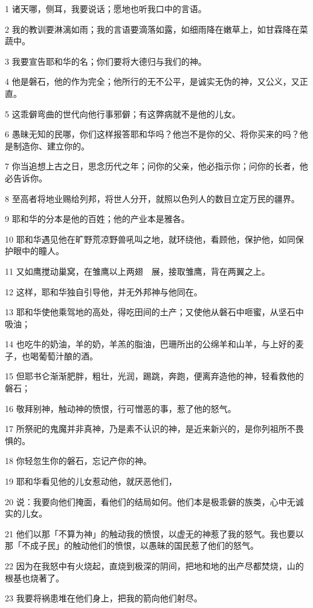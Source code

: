 \par 1 诸天哪，侧耳，我要说话；愿地也听我口中的言语。
\par 2 我的教训要淋漓如雨；我的言语要滴落如露，如细雨降在嫩草上，如甘霖降在菜蔬中。
\par 3 我要宣告耶和华的名；你们要将大德归与我们的神。
\par 4 他是磐石，他的作为完全；他所行的无不公平，是诚实无伪的神，又公义，又正直。
\par 5 这乖僻弯曲的世代向他行事邪僻；有这弊病就不是他的儿女。
\par 6 愚昧无知的民哪，你们这样报答耶和华吗？他岂不是你的父、将你买来的吗？他是制造你、建立你的。
\par 7 你当追想上古之日，思念历代之年；问你的父亲，他必指示你；问你的长者，他必告诉你。
\par 8 至高者将地业赐给列邦，将世人分开，就照以色列人的数目立定万民的疆界。
\par 9 耶和华的分本是他的百姓；他的产业本是雅各。
\par 10 耶和华遇见他在旷野荒凉野兽吼叫之地，就环绕他，看顾他，保护他，如同保护眼中的瞳人。
\par 11 又如鹰搅动巢窝，在雏鹰以上两翅　展，接取雏鹰，背在两翼之上。
\par 12 这样，耶和华独自引导他，并无外邦神与他同在。
\par 13 耶和华使他乘驾地的高处，得吃田间的土产；又使他从磐石中咂蜜，从坚石中吸油；
\par 14 也吃牛的奶油，羊的奶，羊羔的脂油，巴珊所出的公绵羊和山羊，与上好的麦子，也喝葡萄汁酿的酒。
\par 15 但耶书仑渐渐肥胖，粗壮，光润，踢跳，奔跑，便离弃造他的神，轻看救他的磐石；
\par 16 敬拜别神，触动神的愤恨，行可憎恶的事，惹了他的怒气。
\par 17 所祭祀的鬼魔并非真神，乃是素不认识的神，是近来新兴的，是你列祖所不畏惧的。
\par 18 你轻忽生你的磐石，忘记产你的神。
\par 19 耶和华看见他的儿女惹动他，就厌恶他们，
\par 20 说：我要向他们掩面，看他们的结局如何。他们本是极乖僻的族类，心中无诚实的儿女。
\par 21 他们以那「不算为神」的触动我的愤恨，以虚无的神惹了我的怒气。我也要以那「不成子民」的触动他们的愤恨，以愚昧的国民惹了他们的怒气。
\par 22 因为在我怒中有火烧起，直烧到极深的阴间，把地和地的出产尽都焚烧，山的根基也烧著了。
\par 23 我要将祸患堆在他们身上，把我的箭向他们射尽。
